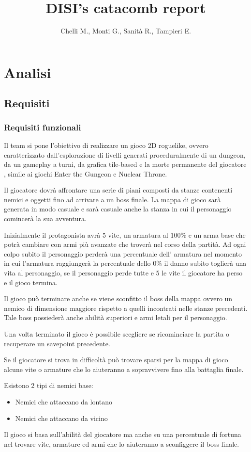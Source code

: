 \documentclass[a4paper,12pt]{report}
\title{DISI's catacomb report}
\author{Chelli M., Monti G., Sanità R., Tampieri E.}
\begin{document}
	\maketitle
	\tableofcontents
	\chapter{Analisi}
	\section{Requisiti}
	\subsection{Requisiti funzionali}
	\par Il team si pone l'obiettivo di realizzare un gioco 2D roguelike,
	ovvero caratterizzato dall'esplorazione di livelli generati proceduralmente
	di un dungeon, da un gameplay a turni, da grafica tile-based e la morte
	permanente del giocatore \cite{wiki:Roguelike}, simile ai giochi Enter the
	Gungeon e Nuclear Throne.
	\par Il giocatore dovrà affrontare una serie di piani composti da stanze contenenti
	nemici e oggetti fino ad arrivare a un boss finale. La mappa di gioco sarà generata
	in modo casuale e sarà casuale anche la stanza in cui il personaggio comincerà
	la sua avventura.
	\par Inizialmente il protagonista avrà 5 vite, un armatura al 100\%
	e un arma base che potrà cambiare con armi più avanzate che troverà nel corso
	della partità. Ad ogni colpo subito il personaggio perderà una percentuale dell'
	armatura nel momento in cui l'armatura raggiungerà la percentuale dello 0\%
	il danno subito toglierà una vita al personaggio, se il personaggio perde tutte
	e 5 le vite il giocatore ha perso e il gioco termina.
	\par Il gioco può terminare anche se viene sconfitto il boss della mappa ovvero
	un nemico di dimensione maggiore rispetto a quelli incontrati nelle stanze precedenti.
	Tale boss possiederà anche abilità superiori e armi letali per il personaggio.
	\par Una volta terminato il gioco è possibile scegliere se ricominciare la partita
	o recuperare un savepoint precedente.
	\par Se il giocatore si trova in difficoltà può trovare sparsi per la mappa di gioco
	alcune vite o armature che lo aiuteranno a sopravvivere fino alla battaglia finale.
	\par Esistono 2 tipi di nemici base:
	\begin{itemize}
		\item Nemici che attaccano da lontano
		\item Nemici che attaccano da vicino
	\end{itemize}
	\par Il gioco si basa sull'abilità del giocatore ma anche su una percentuale di
	fortuna nel trovare vite, armature ed armi che lo aiuteranno a sconfiggere il
	boss finale.
\end{document}
